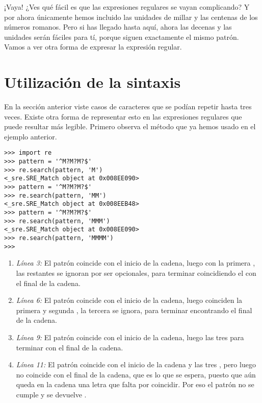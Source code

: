 ¡Vaya! ¿Ves qué fácil es que las expresiones regulares se vayan complicando? Y por ahora únicamente hemos incluido las unidades de millar y las centenas de los números romanos. Pero si has llegado hasta aquí, ahora las decenas y las unidades serán fáciles para tí, porque siguen exactamente el mismo patrón. Vamos a ver otra forma de expresar la expresión regular.

\section{Utilización de la sintaxis }

En la sección anterior viste casos de caracteres que se podían repetir hasta tres veces. Existe otra forma de representar esto en las expresiones regulares que puede resultar más legible. Primero observa el método que ya hemos usado en el ejemplo anterior.

\noindent\begin{minipage}{\textwidth}
\begin{lstlisting}[mathescape=False]
>>> import re
>>> pattern = '^M?M?M?$'
>>> re.search(pattern, 'M')
<_sre.SRE_Match object at 0x008EE090>
>>> pattern = '^M?M?M?$'
>>> re.search(pattern, 'MM')
<_sre.SRE_Match object at 0x008EEB48>
>>> pattern = '^M?M?M?$'
>>> re.search(pattern, 'MMM')
<_sre.SRE_Match object at 0x008EE090>
>>> re.search(pattern, 'MMMM')
>>> 
\end{lstlisting}
\end{minipage}

\begin{enumerate}

\item \emph{Línea 3:} El patrón coincide con el inicio de la cadena, luego con la primera , las restantes se ignoran por ser opcionales, para terminar coincidiendo el \codigo{\$} con el final de la cadena.

\item \emph{Línea 6:} El patrón coincide con el inicio de la cadena, luego coinciden la primera y segunda , la tercera se ignora, para terminar encontrando el final de la cadena.

\item \emph{Línea 9:} El patrón coincide con el inicio de la cadena, luego las tres  para terminar con el final de la cadena.

\item \emph{Línea 11:} El patrón coincide con el inicio de la cadena y las tres , pero luego no coincide con el final de la cadena, que es lo que se espera, puesto que aún queda en la cadena una letra  que falta por coincidir. Por eso el patrón no se cumple y se devuelve .

\end{enumerate}

